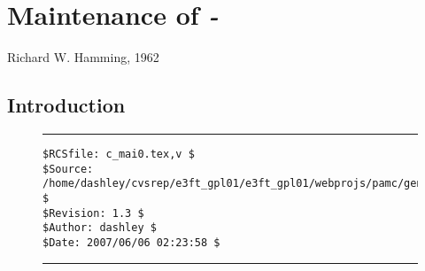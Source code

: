 
\chapter{Maintenance of \emph{\productbasename{}-\productversion{}}}

\label{cmai0}

                  {Richard W. Hamming, 1962}

\section{Introduction}
\label{cmai0:sint0}


\noindent\begin{figure}[!b]
\noindent\rule[-0.25in]{\textwidth}{1pt}
\begin{tiny}
\begin{verbatim}
$RCSfile: c_mai0.tex,v $
$Source: /home/dashley/cvsrep/e3ft_gpl01/e3ft_gpl01/webprojs/pamc/gen_a/docs/manual/man_a/c_mai0/c_mai0.tex,v $
$Revision: 1.3 $
$Author: dashley $
$Date: 2007/06/06 02:23:58 $
\end{verbatim}
\end{tiny}
\noindent\rule[0.25in]{\textwidth}{1pt}
\end{figure}

%
%
%
